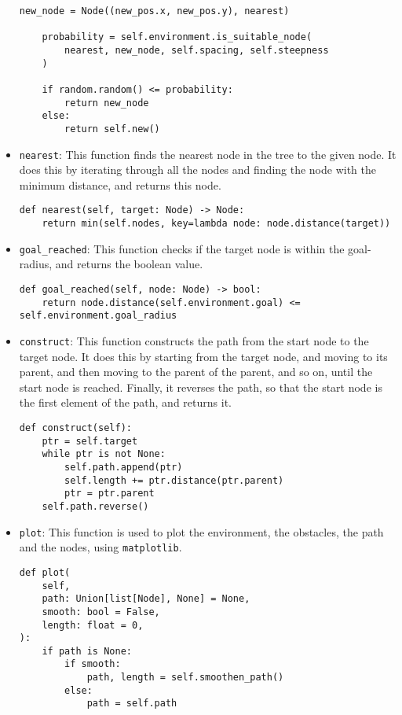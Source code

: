 \documentclass[12pt]{report}
\begin{document}
\begin{itemize}
\begin{lstlisting}[caption={\texttt{RRT.new}}]
    new_node = Node((new_pos.x, new_pos.y), nearest)

    probability = self.environment.is_suitable_node(
        nearest, new_node, self.spacing, self.steepness
    )

    if random.random() <= probability:
        return new_node
    else:
        return self.new()
        \end{lstlisting}
    \item \texttt{nearest}: This function finds the nearest node in the tree to the given node. It does this by iterating through all the nodes and finding the node with the minimum distance, and returns this node.
          \begin{lstlisting}[caption={\texttt{RRT.nearest}}]
def nearest(self, target: Node) -> Node:
    return min(self.nodes, key=lambda node: node.distance(target))
        \end{lstlisting}
    \item \texttt{goal\_reached}: This function checks if the target node is within the goal-radius, and returns the boolean value.
          \begin{lstlisting}[caption={\texttt{RRT.goal\_reached}}]
def goal_reached(self, node: Node) -> bool:
    return node.distance(self.environment.goal) <= self.environment.goal_radius
          \end{lstlisting}
    \item \texttt{construct}: This function constructs the path from the start node to the target node. It does this by starting from the target node, and moving to its parent, and then moving to the parent of the parent, and so on, until the start node is reached. Finally, it reverses the path, so that the start node is the first element of the path, and returns it.
          \begin{lstlisting}[caption={\texttt{RRT.construct}}]
def construct(self):
    ptr = self.target
    while ptr is not None:
        self.path.append(ptr)
        self.length += ptr.distance(ptr.parent)
        ptr = ptr.parent
    self.path.reverse()
        \end{lstlisting}
    \item \texttt{plot}: This function is used to plot the environment, the obstacles, the path and the nodes, using \texttt{matplotlib}.
          \begin{lstlisting}[caption={\texttt{RRT.plot}}]
def plot(
    self,
    path: Union[list[Node], None] = None,
    smooth: bool = False,
    length: float = 0,
):
    if path is None:
        if smooth:
            path, length = self.smoothen_path()
        else:
            path = self.path


\end{lstlisting}
\end{itemize}
\end{document}
